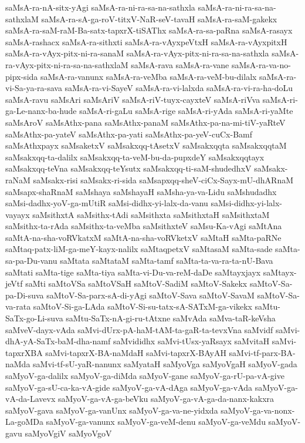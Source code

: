 {saMsA-ra-nA-sitx-yAgi
saMsA-ra-ni-ra-sa-na-sathxla
saMsA-ra-ni-ra-sa-na-sathxlaM
saMsA-ra-sA-ga-roV-titxV-NaR-seV-tavaH
saMsA-ra-saM-gakekx
saMsA-ra-saM-raM-Ba-satx-tapxrX-tiSAThx
saMsA-ra-sa-paRna
saMsA-rasayx
saMsA-rashacx
saMsA-ra-sithxti
saMsA-ra-vAyxpeVtxH
saMsA-ra-vAyxpitxH
saMsA-ra-vAyx-pitx-ni-ra-sanaM
saMsA-ra-vAyx-pitx-ni-ra-sa-na-sathxla
saMsA-ra-vAyx-pitx-ni-ra-sa-na-sathxlaM
saMsA-rava
saMsA-ra-vane
saMsA-ra-va-no-pipx-sida
saMsA-ra-vanunx
saMsA-ra-veMba
saMsA-ra-veM-bu-dilalx
saMsA-ra-vi-Sa-ya-ra-sava
saMsA-ra-vi-SayeV
saMsA-ra-vi-lalxda
saMsA-ra-vi-ra-ha-doLu
saMsA-ravu
saMsAri
saMsAriV
saMsA-riV-tuyx-cayxteV
saMsA-riVva
saMsA-ri-ga-Le-nanx-ba-hude
saMsA-ri-gaLu
saMsA-rige
saMsA-ri-yAda
saMsA-ri-yaMte
saMsAroV
saMsAthx-pana
saMsAthx-panaM
saMsAthx-pa-na-mi-tiV-yaRteV
saMsAthx-pa-yateV
saMsAthx-pa-yati
saMsAthx-pa-yeV-cuCx-Bamf
saMsAthxpayx
saMsaketxV
saMsakxqq-tAsetxV
saMsakxqqta
saMsakxqqtaM
saMsakxqq-ta-dalilx
saMsakxqq-ta-veM-bu-da-pupxdeY
saMsakxqqtayx
saMsakxqq-teVna
saMsakxqq-teYsutx
saMsakxqq-ti-saM-shudedhxV
saMsakx-raNaM
saMsakx-risi
saMsakx-ri-sida
saMsapxqq-sheV-ciCx-Sayx-mU-dhARnaM
saMsapx-shaRnaM
saMshaya
saMshayaH
saMsha-ya-va-Lidu
saMshudadhx
saMsi-dadhx-yoV-ga-mUtiR
saMsi-didhx-yi-lalx-da-vanu
saMsi-didhx-yi-lalx-vayayx
saMsithxtA
saMsithx-tAdi
saMsithxta
saMsithxtaH
saMsithxtaM
saMsithx-ta-rAda
saMsithx-ta-veMba
saMsithxteV
saMsu-Ka-vAgi
saMtAna
saMtA-na-sha-voRVkatxM
saMtA-na-sha-voRVketxV
saMtaH
saMta-paRNe
saMtaq-patx-liM-ga-meY-kayx-nalilx
saMtaqpetxV
saMtasaM
saMta-sade
saMta-sa-pa-Du-vanu
saMtata
saMtataM
saMta-tamf
saMta-ta-va-ra-ta-nU-Bava
saMtati
saMta-tige
saMta-tiya
saMta-vi-Du-va-reM-daDe
saMtayxjayx
saMtayx-jeVtf
saMti
saMtoVSa
saMtoVSaH
saMtoV-SadiM
saMtoV-Sakekx
saMtoV-Sa-pa-Di-suva
saMtoV-Sa-parx-sA-di-yAgi
saMtoV-Sava
saMtoV-SavaM
saMtoV-Sa-va-rata
saMtoV-Si-ga-LAda
saMtoV-Si-su-tatx-sA-SATxM-ga-vikekx
saMtu-SaTx-go-Li-suva
saMtu-SaTx-nA-gi-ru-tAtxne
saMvAda
saMva-taR-keVsha
saMveV-dayx-vAda
saMvi-dUrx-pA-haM-tAM-ta-gaR-ta-tevxVna
saMvidf
saMvi-dhA-yA-SaTx-baM-dha-namf
saMvididhx
saMvi-tUsx-yaRsayx
saMvitaH
saMvi-tapxrXBA
saMvi-tapxrX-BA-naMdaH
saMvi-tapxrX-BAyAH
saMvi-tf-parx-BA-naMda
saMvi-tf-sU-yaR-nanunx
saMyataH
saMyoVga
saMyoVgaH
saMyoV-gada
saMyoV-ga-dalilx
saMyoV-ga-diMda
saMyoV-gane
saMyoV-ga-rU-pa-vA-give
saMyoV-ga-sU-ca-ka-vA-gide
saMyoV-ga-vA-dAga
saMyoV-ga-vAda
saMyoV-ga-vA-da-Lavevx
saMyoV-ga-vA-ga-beVku
saMyoV-ga-vA-ga-da-nanx-kakxra
saMyoV-gava
saMyoV-ga-vanUnx
saMyoV-ga-va-ne-yidxda
saMyoV-ga-va-nonx-La-goMDa
saMyoV-ga-vanunx
saMyoV-ga-veM-denu
saMyoV-ga-veMdu
saMyoV-gavu
saMyoVgiV
saMyoVgoV
}
